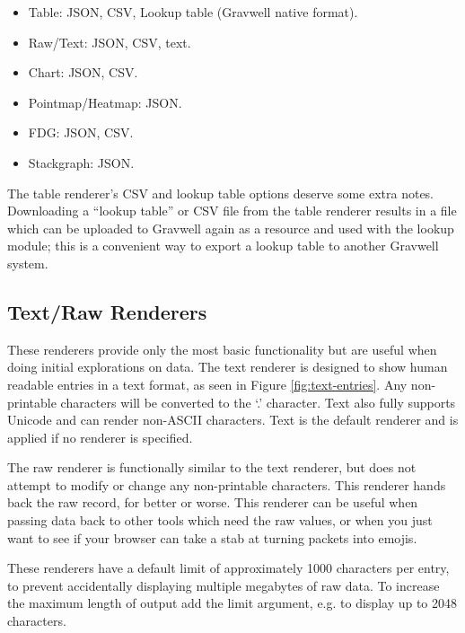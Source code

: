 \begin{itemize}
\item
  Table: JSON, CSV, Lookup table (Gravwell native format).
\item
  Raw/Text: JSON, CSV, text.
\item
  Chart: JSON, CSV.
\item
  Pointmap/Heatmap: JSON.
\item
  FDG: JSON, CSV.
\item
  Stackgraph: JSON.
\end{itemize}

The table renderer's CSV and lookup table options deserve some extra notes.
Downloading a ``lookup table'' or CSV file
from the table renderer results in a file which can be uploaded to
Gravwell again as a resource and used with the lookup module; this is a
convenient way to export a lookup table to another Gravwell system.


\subsection{Text/Raw Renderers}
These renderers provide only the most basic functionality but are
useful when doing initial explorations on data. The text renderer is
designed to show human readable entries in a text format, as seen in Figure \ref{fig:text-entries}. Any
non-printable characters will be converted to the `.' character. Text
also fully supports Unicode and can render non-ASCII characters. Text is
the default renderer and is applied if no renderer is specified.

The raw renderer is functionally similar to the text renderer, but does
not attempt to modify or change any non-printable characters. This
renderer hands back the raw record, for better or worse. This renderer
can be useful when passing data back to other tools which need the raw
values, or when you just want to see if your browser can take a stab at
turning packets into emojis.

These renderers have a default limit of approximately 1000 characters per
entry, to prevent accidentally displaying multiple megabytes of raw
data. To increase the maximum length of output add the limit argument, 
e.g.  to display up to 2048 characters.

